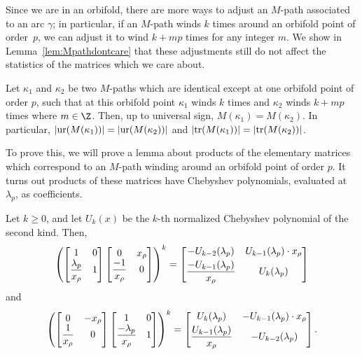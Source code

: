Since we are in an orbifold, there are more ways to adjust an $M$-path associated to an arc $\gamma$; in particular, if an $M$-path winds $k$ times around an orbifold point of order~$p$, we can adjust it to wind $k + m p$ times for any integer $m$. We show in Lemma~\ref{lem:Mpathdontcare} that these adjustments still do not affect the statistics of the matrices which we care about.

\begin{Lemma}\label{lem:Mpathdontcare}
Let $\kappa_1$ and $\kappa_2$ be two $M$-paths which are identical except at one orbifold point of order $p$, such that at this orbifold point $\kappa_1$ winds $k$ times and $\kappa_2$ winds $k + mp$ times where $m \in \Z$. Then, up to universal sign, $M(\kappa_1) = M(\kappa_2)$. In particular, $\vert {\rm ur}(M(\kappa_1)) \vert = \vert {\rm ur}(M(\kappa_2))\vert$ and $\vert {\rm tr}(M(\kappa_1)) \vert = \vert {\rm tr}(M(\kappa_2)) \vert $.
\end{Lemma}

To prove this, we will prove a lemma about products of the elementary matrices which correspond to an $M$-path winding around an orbifold point of order $p$. It turns out products of these matrices have Chebyshev polynomials, evaluated at~$\lambda_p$, as coefficients.

\begin{Lemma} \label{lem:ChebyshevMatrices}
Let $k \geq 0$, and let $U_k(x)$ be the $k$-th normalized Chebyshev polynomial of the second kind. Then,
\begin{equation}\label{eqn:chebymatrix}
\left( \begin{bmatrix} 1 & 0 \\ \dfrac{\lambda_p}{x_\rho} & 1 \end{bmatrix} \begin{bmatrix} 0 & x_\rho \\ \dfrac{-1}{x_\rho} & 0 \end{bmatrix} \right)^k = \begin{bmatrix} -U_{k-2} (\lambda_p) & U_{k-1}(\lambda_p) \cdot x_\rho \vspace{1mm}\\ \dfrac{-U_{k-1}(\lambda_p)}{x_\rho} & U_k(\lambda_p) \end{bmatrix}
\end{equation}
and
\begin{equation}\label{eqn:negchebymatrix}
\left( \begin{bmatrix} 0 & -x_\rho \\ \dfrac{1}{x_\rho} & 0 \end{bmatrix} \begin{bmatrix} 1 & 0 \\ \dfrac{-\lambda_p}{x_\rho} & 1 \end{bmatrix} \right)^k = \begin{bmatrix} U_{k} (\lambda_p) & -U_{k-1}(\lambda_p) \cdot x_\rho \vspace{1mm}\\ \dfrac{U_{k-1}(\lambda_p)}{x_\rho} & -U_{k-2}(\lambda_p) \end{bmatrix}.
\end{equation}
\end{Lemma}

